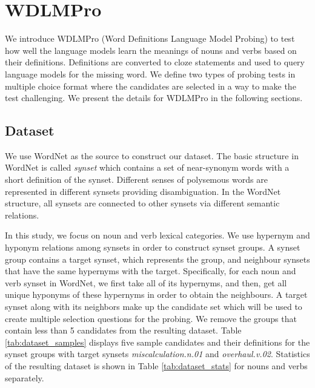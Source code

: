 \documentclass[11pt,a4paper]{article}
\begin{document}
\section{WDLMPro}
We introduce WDLMPro (Word Definitions Language Model Probing) to test how well the language models learn the meanings of nouns and verbs based on their definitions. Definitions are converted to cloze statements and used to query language models for the missing word. We define two types of probing tests in multiple choice format where the candidates are selected in a way to make the test challenging. We present the details for WDLMPro in the following sections.

\subsection{Dataset}

We use WordNet \cite{miller95wordnet} as the source to construct our dataset. The basic structure in WordNet is called \textit{synset} which contains a set of near-synonym words with a short definition of the synset. Different senses of polysemous words are represented in different synsets providing disambiguation. In the WordNet structure, all synsets are connected to other synsets via different semantic relations. 

In this study, we focus on noun and verb lexical categories. We use hypernym and hyponym relations among synsets in order to construct synset groups. A synset group contains a target synset, which represents the group, and neighbour synsets that have the same hypernyms with the target. Specifically, for each noun and verb synset in WordNet, we first take all of its hypernyms, and then, get all unique hyponyms of these hypernyms in order to obtain the neighbours.
A target synset along with its neighbors make up the candidate set which will be used to create multiple selection questions for the probing. We remove the groups that contain less than 5 candidates from the resulting dataset. Table \ref{tab:dataset_samples} displays five sample candidates and their definitions for the synset groups with target synsets \emph{miscalculation.n.01} and \emph{overhaul.v.02}. Statistics of the resulting dataset is shown in Table \ref{tab:dataset_stats} for nouns and verbs separately.
\end{document}

